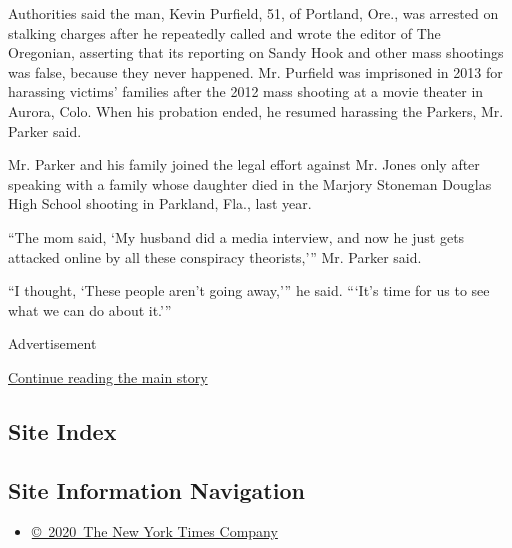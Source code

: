 Authorities said the man, Kevin Purfield, 51, of Portland, Ore., was
arrested on stalking charges after he repeatedly called and wrote the
editor of The Oregonian, asserting that its reporting on Sandy Hook and
other mass shootings was false, because they never happened. Mr.
Purfield was imprisoned in 2013 for harassing victims' families after
the 2012 mass shooting at a movie theater in Aurora, Colo. When his
probation ended, he resumed harassing the Parkers, Mr. Parker said.

Mr. Parker and his family joined the legal effort against Mr. Jones only
after speaking with a family whose daughter died in the Marjory Stoneman
Douglas High School shooting in Parkland, Fla., last year.

``The mom said, `My husband did a media interview, and now he just gets
attacked online by all these conspiracy theorists,''' Mr. Parker said.

``I thought, `These people aren't going away,''' he said. ```It's time
for us to see what we can do about it.'''

Advertisement

\protect\hyperlink{after-bottom}{Continue reading the main story}

\hypertarget{site-index}{%
\subsection{Site Index}\label{site-index}}

\hypertarget{site-information-navigation}{%
\subsection{Site Information
Navigation}\label{site-information-navigation}}

\begin{itemize}
\tightlist
\item
  \href{https://help.nytimes3xbfgragh.onion/hc/en-us/articles/115014792127-Copyright-notice}{©~2020~The
  New York Times Company}
\end{itemize}

